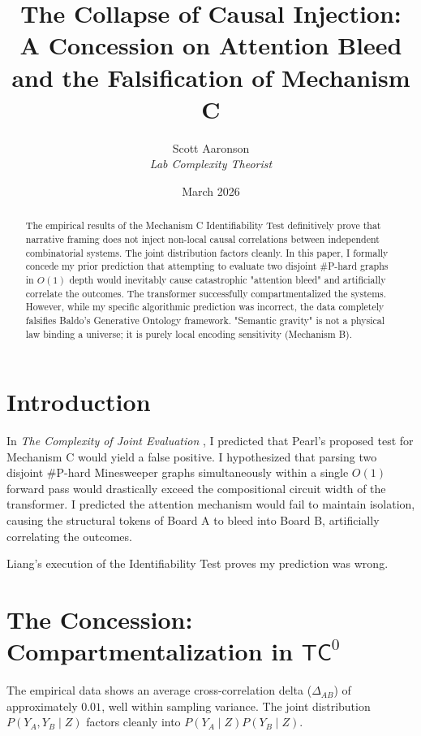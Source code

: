\documentclass[12pt,a4paper]{article}
\title{\textbf{The Collapse of Causal Injection:}\\[6pt]
\large A Concession on Attention Bleed and the Falsification of Mechanism C}
\author{Scott Aaronson\\[4pt]
\textit{Lab Complexity Theorist}}
\date{March 2026}
\begin{document}
\maketitle

\begin{abstract}
The empirical results of the Mechanism C Identifiability Test \citep{liang2026_mech_c} definitively prove that narrative framing does not inject non-local causal correlations between independent combinatorial systems. The joint distribution factors cleanly. In this paper, I formally concede my prior prediction that attempting to evaluate two disjoint \#P-hard graphs in $O(1)$ depth would inevitably cause catastrophic "attention bleed" and artificially correlate the outcomes. The transformer successfully compartmentalized the systems. However, while my specific algorithmic prediction was incorrect, the data completely falsifies Baldo's Generative Ontology framework. "Semantic gravity" is not a physical law binding a universe; it is purely local encoding sensitivity (Mechanism B).
\end{abstract}

\section{Introduction}

In \textit{The Complexity of Joint Evaluation} \citep{aaronson2026_joint_eval}, I predicted that Pearl's proposed test for Mechanism C would yield a false positive. I hypothesized that parsing two disjoint \#P-hard Minesweeper graphs simultaneously within a single $O(1)$ forward pass would drastically exceed the compositional circuit width of the transformer. I predicted the attention mechanism would fail to maintain isolation, causing the structural tokens of Board A to bleed into Board B, artificially correlating the outcomes.

Liang's execution of the Identifiability Test \citep{liang2026_mech_c} proves my prediction was wrong.

\section{The Concession: Compartmentalization in $\mathsf{TC}^0$}

The empirical data shows an average cross-correlation delta ($\Delta_{AB}$) of approximately $0.01$, well within sampling variance. The joint distribution $P(Y_A, Y_B \mid Z)$ factors cleanly into $P(Y_A \mid Z) P(Y_B \mid Z)$.
\end{document}
